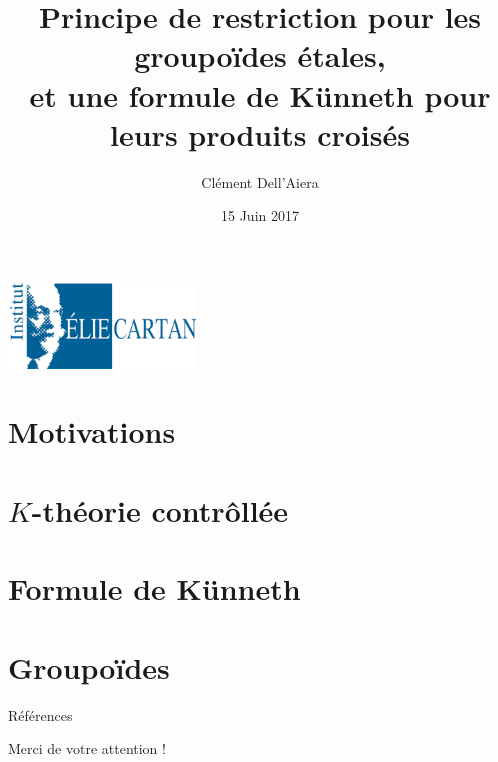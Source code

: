 \documentclass{beamer}
\title[First Steps with SCRATCH]{Principe de restriction pour les groupoïdes étales,\\ et une formule de Künneth pour leurs produits croisés}
\author{Clément Dell'Aiera}
\institute{IECL}
\date{15 Juin 2017}
\begin{document}
\begin{frame}
  \titlepage
\begin{center}\includegraphics[width=5cm]{IECL.png}\end{center}
\end{frame}

\section{Motivations}


\section{$K$-théorie contrôllée}


\section{Formule de Künneth}


\section{Groupoïdes}


\begin{frame}{Références}


\end{frame} 

\begin{frame}{}
Merci de votre attention !
\end{frame}
\end{document}
